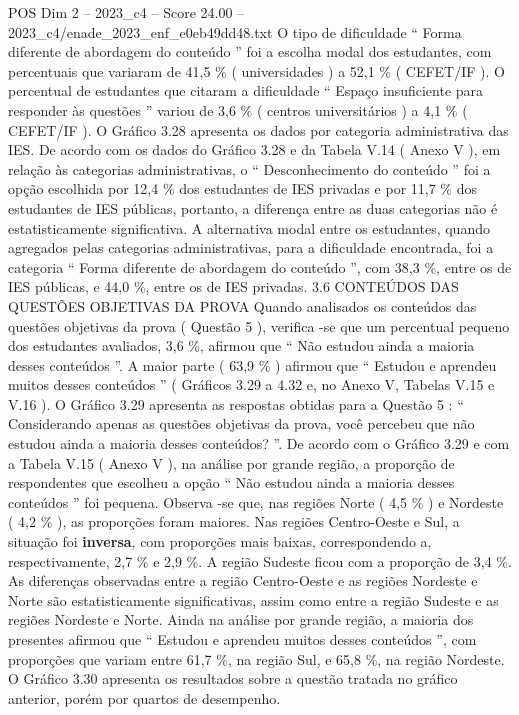 \begin{textsample}{POS Dim 2 – 2023\_c4 – Score 24.00 – 2023\_c4/enade\_2023\_enf\_e0eb49dd48.txt}
O tipo de dificuldade “ Forma diferente de abordagem do conteúdo ” foi a escolha modal dos estudantes, com percentuais que variaram de 41,5 \% ( universidades ) a 52,1 \% ( CEFET/IF ).
O percentual de estudantes que citaram a dificuldade “ Espaço insuficiente para responder às questões ” variou de 3,6 \% ( centros universitários ) a 4,1 \% ( CEFET/IF ).
O Gráfico 3.28 apresenta os dados por categoria administrativa das IES.
De acordo com os dados do Gráfico 3.28 e da Tabela V.14 ( Anexo V ), em relação às categorias administrativas, o “ Desconhecimento do conteúdo ” foi a opção escolhida por 12,4 \% dos estudantes de IES privadas e por 11,7 \% dos estudantes de IES públicas, portanto, a diferença entre as duas categorias não é estatisticamente significativa.
A alternativa modal entre os estudantes, quando agregados pelas categorias administrativas, para a dificuldade encontrada, foi a categoria “ Forma diferente de abordagem do conteúdo ”, com 38,3 \%, entre os de IES públicas, e 44,0 \%, entre os de IES privadas. 3.6 CONTEÚDOS DAS QUESTÕES OBJETIVAS DA PROVA Quando analisados os conteúdos das questões objetivas da prova ( Questão 5 ), verifica -se que um percentual pequeno dos estudantes avaliados, 3,6 \%, afirmou que “ Não estudou ainda a maioria desses conteúdos ”.
A maior parte ( 63,9 \% ) afirmou que “ Estudou e aprendeu muitos desses conteúdos ” ( Gráficos 3.29 a 4.32 e, no Anexo V, Tabelas V.15 e V.16 ).
O Gráfico 3.29 apresenta as respostas obtidas para a Questão 5 : “ Considerando apenas as questões objetivas da prova, você percebeu que não estudou ainda a maioria desses conteúdos? ”.
De acordo com o Gráfico 3.29 e com a Tabela V.15 ( Anexo V ), na análise por grande região, a proporção de respondentes que escolheu a opção “ Não estudou ainda a maioria desses conteúdos ” foi pequena.
Observa -se que, nas regiões Norte ( 4,5 \% ) e Nordeste ( 4,2 \% ), as proporções foram maiores.
Nas regiões Centro-Oeste e Sul, a situação foi \textbf{inversa}, com proporções mais baixas, correspondendo a, respectivamente, 2,7 \% e 2,9 \%.
A região Sudeste ficou com a proporção de 3,4 \%.
As diferenças observadas entre a região Centro-Oeste e as regiões Nordeste e Norte são estatisticamente significativas, assim como entre a região Sudeste e as regiões Nordeste e Norte.
Ainda na análise por grande região, a maioria dos presentes afirmou que “ Estudou e aprendeu muitos desses conteúdos ”, com proporções que variam entre 61,7 \%, na região Sul, e 65,8 \%, na região Nordeste.
O Gráfico 3.30 apresenta os resultados sobre a questão tratada no gráfico anterior, porém por quartos de desempenho.

\end{textsample}
